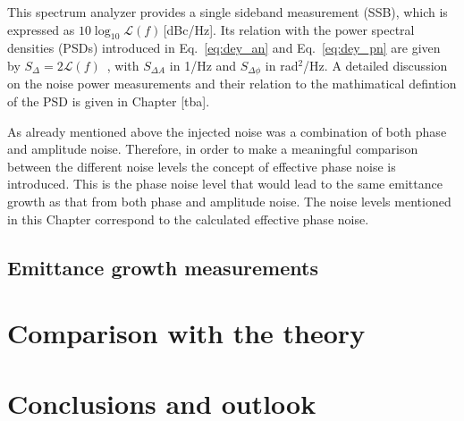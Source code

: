\begin{sloppypar} %
This spectrum analyzer provides a single sideband measurement (SSB), which is expressed as $10\log_{10}\mathcal{L}(f)$\,[dBc/Hz]. Its relation with the power spectral densities (PSDs) introduced in Eq.~\eqref{eq:dey_an} and Eq.~\eqref{eq:dey_pn} are given by $S_\Delta = 2\mathcal{L}(f)$~\cite{IEEE:4797525}, with $S_{\Delta A}$ in 1/Hz and $S_{\Delta\phi}$ in rad$^2$/Hz. A detailed discussion on the noise power measurements and their relation to the mathimatical defintion of the PSD is given in Chapter [tba].

As already mentioned above the injected noise was a combination of both phase and amplitude noise. Therefore, in order to make a meaningful comparison between the different noise levels the concept of effective phase noise is introduced. This is the phase noise level that would lead to
the same emittance growth as that from both phase and
amplitude noise. The noise levels mentioned in this Chapter correspond to the calculated effective phase noise.
\end{sloppypar} 

\subsection{Emittance growth measurements}\label{subsec:EmitGrowth_measurements}


 \section{Comparison with the theory}\label{sec:MD2018_vs_theory}


 \section{Conclusions and outlook}